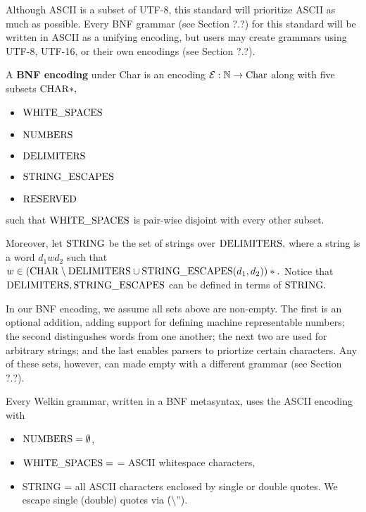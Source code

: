 Although ASCII is a subset of UTF-8, this standard will prioritize ASCII as much as possible. Every BNF grammar (see Section ?.?) for this standard will be written in ASCII as a unifying encoding, but users may create grammars using UTF-8, UTF-16, or their own encodings (see Section ?.?).


\begin{definition}
  A \textbf{BNF encoding} under Char is an encoding $\mathcal{E}: \mathbb{N} \to \textrm{Char}$ along with five subsets $\mathrm{CHAR}*,$
  \begin{itemize}
  \item $\mathrm{WHITE\_SPACES}$
  \item $\mathrm{NUMBERS}$
  \item $\mathrm{DELIMITERS}$
  \item $\mathrm{STRING\_ESCAPES}$
  \item $\mathrm{RESERVED}$
  \end{itemize}
  such that $\mathrm{WHITE\_SPACES}$ is pair-wise disjoint with every other subset.

Moreover, let $\mathrm{STRING}$ be the set of strings over $\mathrm{DELIMITERS},$ where a string is a word $d_{1}wd_{2}$ such that $w \in (\mathrm{CHAR} \setminus \mathrm{DELIMITERS} \cup \mathrm{STRING\_ESCAPES}(d_{1}, d_{2}))*.$ Notice that $\mathrm{DELIMITERS}, \mathrm{STRING\_ESCAPES}$ can be defined in terms of $\mathrm{STRING}.$
\end{definition}
In our BNF encoding, we assume all sets above are non-empty. The first is an optional addition, adding support for defining machine representable numbers; the second distingushes words from one another; the next two are used for arbitrary strings; and the last enables parsers to priortize certain characters. Any of these sets, however, can made empty with a different grammar (see Section ?.?).





Every Welkin grammar, written in a BNF metasyntax, uses the ASCII encoding with
\begin{itemize}
  \item $\mathrm{NUMBERS} = \emptyset$,
  \item $\mathrm{WHITE\_SPACES} = $ = ASCII whitespace characters,
  \item STRING = all ASCII characters enclosed by single or double quotes. We escape single (double) quotes via \' (\textbackslash'').
\end{itemize}

